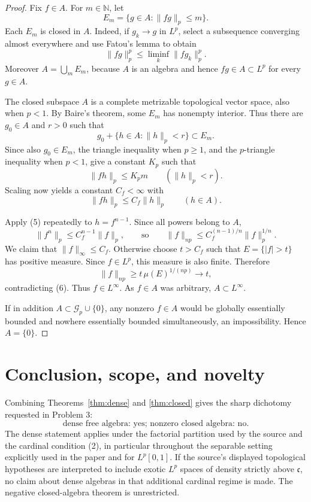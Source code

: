 \documentclass[11pt]{article}
\newcommand{\N}{\mathbb N}
\newcommand{\cG}{\mathcal G}
\begin{document}
\begin{proof}
Fix $f\in A$.  For $m\in\N$, let
\[
  E_m=\{g\in A:\|fg\|_p\leq m\}.
\]
Each $E_m$ is closed in $A$.  Indeed, if $g_k\to g$ in $L^p$, select a
subsequence converging almost everywhere and use Fatou's lemma to obtain
\[
  \|fg\|_p^p\leq\liminf_k\|fg_k\|_p^p.
\]
Moreover $A=\bigcup_mE_m$, because $A$ is an algebra and hence $fg\in A
\subset L^p$ for every $g\in A$.

The closed subspace $A$ is a complete metrizable topological vector space,
also when $p<1$.  By Baire's theorem, some $E_m$ has nonempty interior.
Thus there are $g_0\in A$ and $r>0$ such that
\[
  g_0+\{h\in A:\|h\|_p<r\}\subset E_m.
\]
Since also $g_0\in E_m$, the triangle inequality when $p\geq1$, and the
$p$-triangle inequality when $p<1$, give a constant $K_p$ such that
\[
  \|fh\|_p\leq K_pm\qquad(\|h\|_p<r).
\]
Scaling now yields a constant $C_f<\infty$ with
\begin{equation}
  \|fh\|_p\leq C_f\|h\|_p\qquad(h\in A).
\end{equation}

Apply (5) repeatedly to $h=f^{n-1}$.  Since all powers belong to $A$,
\[
 \|f^n\|_p\leq C_f^{n-1}\|f\|_p,
 \qquad\text{so}\qquad
 \|f\|_{np}\leq
 C_f^{(n-1)/n}\|f\|_p^{1/n}.
\]
We claim that $\|f\|_\infty\leq C_f$.  Otherwise choose $t>C_f$ such that
$E=\{|f|>t\}$ has positive measure.  Since $f\in L^p$, this measure is also
finite.  Therefore
\[
  \|f\|_{np}\geq t\,\mu(E)^{1/(np)}\longrightarrow t,
\]
contradicting (6).  Thus $f\in L^\infty$.  As $f\in A$ was arbitrary,
$A\subset L^\infty$.

If in addition $A\subset\cG_p\cup\{0\}$, any nonzero $f\in A$ would be
globally essentially bounded and nowhere essentially bounded simultaneously,
an impossibility.  Hence $A=\{0\}$.
\end{proof}

\section{Conclusion, scope, and novelty}

Combining Theorems~\ref{thm:dense} and \ref{thm:closed} gives the sharp
dichotomy requested in Problem 3:
\[
 \boxed{\text{dense free algebra: yes; nonzero closed algebra: no.}}
\]
The dense statement applies under the factorial partition used by the source
and the cardinal condition (2), in particular throughout the separable
setting explicitly used in the paper and for $L^p[0,1]$.  If the source's
displayed topological hypotheses are interpreted to include exotic $L^p$
spaces of density strictly above $\mathfrak c$, no claim about dense algebras
in that additional cardinal regime is made.  The negative closed-algebra
theorem is unrestricted.
\end{document}

